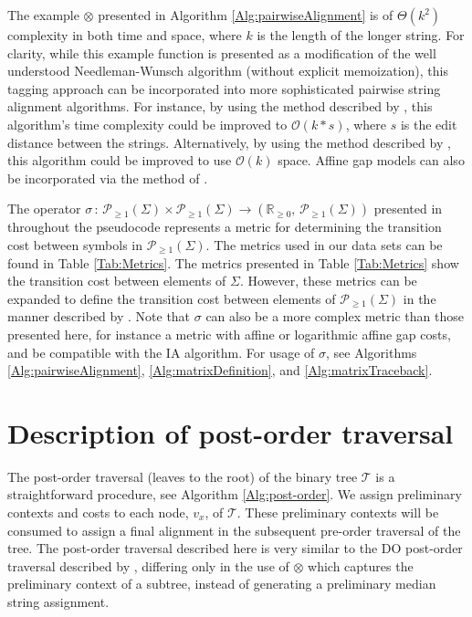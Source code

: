 \documentclass{bmcart}
\newcommand*\NEPowerset{\mathcal{P}_{\geq 1}}
\newcommand*\NonNegReals{\mathbb{R}_{\geq 0}}
\begin{document}
The example $\otimes$ presented in Algorithm \ref{Alg:pairwiseAlignment} is of $\Theta\left( k^2 \right)$ complexity in both time and space, where $k$ is the length of the longer string.
For clarity, while this example function is presented as a modification of the well understood Needleman-Wunsch algorithm (without explicit memoization), this tagging approach can be incorporated into more sophisticated pairwise string alignment algorithms.
For instance, by using the method described by \cite{Ukkonen1985100}, this algorithm's time complexity could be improved to $\mathcal{O}\left( k * s \right)$, where $s$ is the edit distance between the strings. 
Alternatively, by using the method described by \cite{Hirschberg1975}, this algorithm could be improved to use $\mathcal{O}\left( k \right)$ space.
Affine gap models \cite{Gotoh1982} can also be incorporated via the method of \cite{VaronandWheeler2012}.

The operator $\sigma \,:\, \NEPowerset(\Sigma) \times \NEPowerset(\Sigma) \rightarrow \left(\NonNegReals,\, \NEPowerset(\Sigma) \right)$ presented in throughout the pseudocode represents a metric for determining the transition cost between symbols in $\NEPowerset (\Sigma)$.
The metrics used in our data sets can be found in Table \ref{Tab:Metrics}. The metrics presented in Table \ref{Tab:Metrics} show the transition cost between elements of $\Sigma$.
However, these metrics can be expanded to define the transition cost between elements of $\NEPowerset(\Sigma)$ in the manner described by \cite{VaronandWheeler2012}.
Note that $\sigma$ can also be a more complex metric than those presented here, for instance a metric with affine or logarithmic affine gap costs, and be compatible with the IA algorithm. For usage of $\sigma$, see Algorithms \ref{Alg:pairwiseAlignment}, \ref{Alg:matrixDefinition}, and \ref{Alg:matrixTraceback}.


\section*{Description of post-order traversal}

The post-order traversal (leaves to the root) of the binary tree $\mathcal{T}$ is a straightforward procedure, see Algorithm \ref{Alg:post-order}.
We assign preliminary contexts and costs to each node, $v_x$, of $\mathcal{T}$.
These preliminary contexts will be consumed to assign a final alignment in the subsequent pre-order traversal of the tree.
The post-order traversal described here is very similar to the DO post-order traversal described by \cite{Wheeler2003}, differing only in the use of $\otimes$ which captures the preliminary context of a subtree, instead of generating a preliminary median string assignment.
\end{document}
